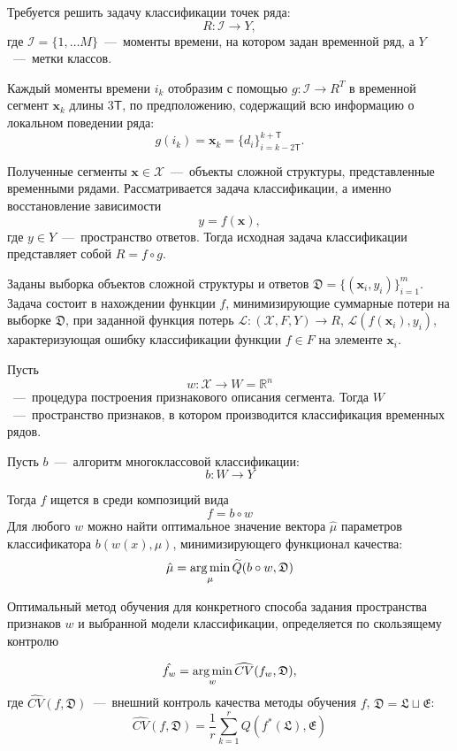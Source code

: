 \documentclass[12pt, twoside]{article}
\begin{document}
Требуется решить задачу классификации точек ряда: $$R:\mathcal{I}\rightarrow Y,$$ где $\mathcal{I}=\{1,\ldots M\}$~---~моменты времени, на котором задан временной ряд, а $Y$~---~метки классов.

Каждый моменты времени $i_k$ отобразим с помощью $g:\mathcal{I}\rightarrow R^T$ в временной сегмент $\mathbf{x}_k$ длины $3\mathsf{T}$, по предположению, содержащий всю информацию о локальном поведении ряда:
\begin{equation}\label{eq1}
g(i_k) = \mathbf{x}_k = \{d_i\}_{i=k-2\mathsf{T}}^{k+\mathsf{T}}.
\end{equation}

Полученные сегменты $\mathbf{x} \in \mathcal{X}$~---~объекты сложной структуры, представленные временными рядами. Рассматривается задача классификации, а именно восстановление зависимости $$y=f(\mathbf{x}),$$ где $y\in Y$~---~пространство ответов. Тогда исходная задача классификации представляет собой $R=f\circ g$.

Заданы выборка объектов сложной структуры и ответов $\mathfrak{D}=\{(\mathbf{x}_i,y_i)\}_{i=1}^m$. Задача состоит в нахождении функции $f$, минимизирующие суммарные потери на выборке $\mathfrak{D}$, при заданной функция потерь $\mathscr{L}:(\mathcal{X},F,Y)\rightarrow R$, $\mathscr{L}(f(\mathbf{x}_i),y_i)$, характеризующая ошибку классификации функции $f\in F$ на элементе $\mathbf{x}_i$. 

Пусть $$w:\mathcal{X}\rightarrow W = \mathds{R}^n$$~---~процедура построения признакового описания сегмента. Тогда $W$~---~пространство признаков, в котором производится классификация временных рядов.

Пусть $b$~---~алгоритм многоклассовой классификации: $$b:W\rightarrow Y$$

Тогда $f$ ищется в среди композиций вида 
$$f=b\circ w$$
Для любого $w$ можно найти оптимальное значение вектора $\hat\mu$ параметров классификатора $b(w(x),\mu)$, минимизирующего функционал качества: 
\begin{equation}\label{func_loss}
\hat\mu=\argmin_\mu \widetilde{Q}(b\circ w,\mathfrak{D})
\end{equation}

Оптимальный метод обучения для конкретного способа задания пространства признаков $w$ и выбранной модели классификации, определяется по скользящему контролю

$$\hat{f_{w}}=\argmin\limits_{w}\widehat{CV}(f_{w},\mathfrak{D}),$$ 
где $\widehat{CV}(f,\mathfrak{D})$~---~внешний контроль качества методы обучения $f$, $\mathfrak{D}=\mathfrak{L}\sqcup\mathfrak{E}$:
 \begin{equation}\label{CV}
\widehat{CV}(f, \mathfrak{D})=\frac{1}{r}\sum\limits_{k=1}^r Q(f^*(\mathfrak{L}),\mathfrak{E})
\end{equation}
\end{document}
